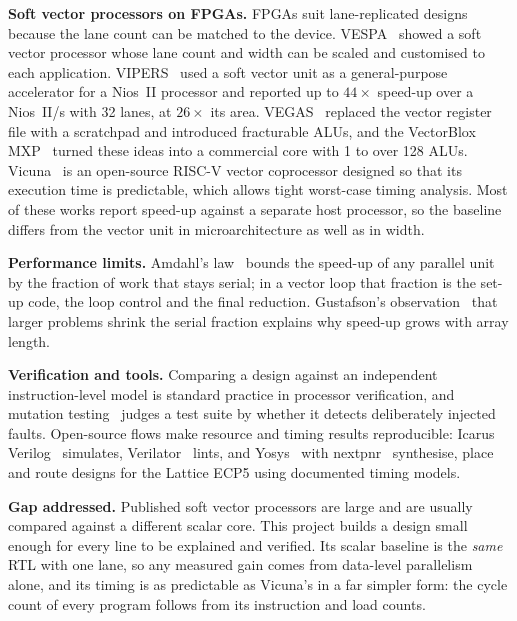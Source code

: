 \documentclass[journal]{IEEEtran}
\newcommand{\x}{\ensuremath{\times}}
\begin{document}
\textbf{Soft vector processors on FPGAs.} FPGAs suit lane-replicated designs because
the lane count can be matched to the device. VESPA~\cite{vespa} showed a soft vector
processor whose lane count and width can be scaled and customised to each application.
VIPERS~\cite{vipers} used a soft vector unit as a general-purpose accelerator for a
Nios~II processor and reported up to $44\x$ speed-up over a Nios~II/s with 32 lanes, at
$26\x$ its area. VEGAS~\cite{vegas} replaced the
vector register file with a scratchpad and introduced fracturable ALUs, and the
VectorBlox MXP~\cite{mxp} turned these ideas into a commercial core with 1 to over 128
ALUs. Vicuna~\cite{vicuna} is an open-source RISC-V vector coprocessor designed so that
its execution time is predictable, which allows tight worst-case timing analysis.
Most of these works report speed-up against a separate host processor, so the baseline
differs from the vector unit in microarchitecture as well as in width.

\textbf{Performance limits.} Amdahl's law~\cite{amdahl} bounds the speed-up of any
parallel unit by the fraction of work that stays serial; in a vector loop that
fraction is the set-up code, the loop control and the final reduction. Gustafson's
observation~\cite{gustafson} that larger problems shrink the serial fraction explains
why speed-up grows with array length. 

\textbf{Verification and tools.} Comparing a design against an independent
instruction-level model is standard practice in processor verification, and mutation
testing~\cite{demillo} judges a test suite by whether it detects deliberately injected
faults. Open-source flows make resource and timing results reproducible: Icarus
Verilog~\cite{icarus} simulates, Verilator~\cite{verilator} lints, and
Yosys~\cite{yosys} with nextpnr~\cite{nextpnr} synthesise, place and route designs for
the Lattice ECP5 using documented timing models.

\textbf{Gap addressed.} Published soft vector processors are large and are usually
compared against a different scalar core. This project builds a design small enough
for every line to be explained and verified. Its scalar baseline is the \emph{same}
RTL with one lane, so any measured gain comes from data-level parallelism alone, and
its timing is as predictable as Vicuna's in a far simpler form: the cycle count of
every program follows from its instruction and load counts.

\end{document}
